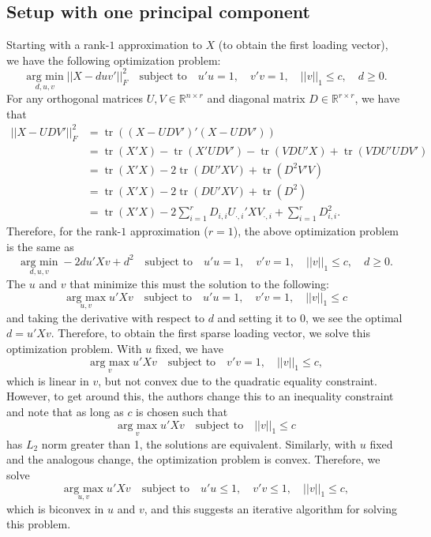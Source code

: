 \documentclass[11pt]{article}
\newcommand{\argmax}{\operatorname*{arg \ max}}
\newcommand{\argmin}{\operatorname*{arg \ min}}
\newcommand{\tr}{\operatorname*{tr}}
\begin{document}
\subsection{Setup with one principal component}
Starting with a rank-$1$ approximation to $X$ (to obtain the first loading vector), we have the following optimization problem:
$$
\argmin_{d, u, v} ||X - duv'||_F^2 \quad \text{subject to} \quad u'u = 1, \quad v'v = 1, \quad ||v||_1 \leq c, \quad d \geq 0.
$$
For any orthogonal matrices $U, V \in \mathbb{R}^{n \times r}$ and diagonal matrix $D \in \mathbb{R}^{r \times r}$, we have that
\begin{align*}
||X - UDV'||_F^2 &= \tr((X - UDV')'(X - UDV')) \\
&= \tr(X'X) - \tr(X'UDV') - \tr(VDU'X) + \tr(VDU'UDV') \\
&= \tr(X'X) - 2\tr(DU'XV) + \tr(D^2V'V) \\
&= \tr(X'X) - 2\tr(DU'XV) + \tr(D^2) \\
&= \tr(X'X) - 2\sum_{i = 1}^{r} D_{i, i} U_{\cdot, i}'XV_{\cdot, i} +  \sum_{i = 1}^{r} D_{i, i}^2.
\end{align*}
Therefore, for the rank-$1$ approximation ($r = 1$), the above optimization problem is the same as
$$
\argmin_{d, u, v} -2du'Xv + d^2 \quad \text{subject to} \quad u'u = 1, \quad v'v = 1, \quad ||v||_1 \leq c, \quad d \geq 0.
$$
The $u$ and $v$ that minimize this must the solution to the following:
$$
\argmax_{u, v} u'Xv \quad \text{subject to} \quad u'u = 1, \quad v'v = 1, \quad ||v||_1 \leq c
$$
and taking the derivative with respect to $d$ and setting it to $0$, we see the optimal $d = u'Xv$. Therefore, to obtain the first sparse loading vector, we solve this optimization problem. With $u$ fixed, we have
$$
\argmax_{v} u'Xv \quad \text{subject to} \quad v'v = 1, \quad ||v||_1 \leq c,
$$
which is linear in $v$, but not convex due to the quadratic equality constraint. However, to get around this, the authors change this to an inequality constraint and note that as long as $c$ is chosen such that
$$
\argmax_{v} u'Xv \quad \text{subject to} \quad ||v||_1 \leq c
$$
has $L_2$ norm greater than 1, the solutions are equivalent. Similarly, with $u$ fixed and the analogous change, the optimization problem is convex. Therefore, we solve 
$$
\argmax_{u, v} u'Xv \quad \text{subject to} \quad u'u \leq 1, \quad v'v \leq 1, \quad ||v||_1 \leq c,
$$
which is biconvex in $u$ and $v$, and this suggests an iterative algorithm for solving this problem. 
\end{document}
